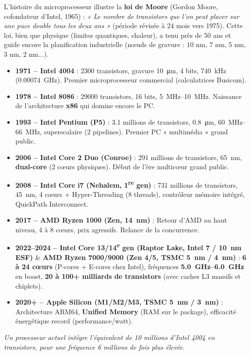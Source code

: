 \documentclass[11pt]{article}
\begin{document}
\noindent
L'histoire du microprocesseur illustre la \textbf{loi de Moore} (Gordon Moore, cofondateur d'Intel, 1965) : \emph{« Le nombre de transistors que l'on peut placer sur une puce double tous les deux ans »} (période révisée à 24 mois vers 1975). Cette loi, bien que physique (limites quantiques, chaleur), a tenu près de 50 ans et guide encore la planification industrielle (nœuds de gravure : 10 nm, 7 nm, 5 nm, 3 nm, 2 nm...).

\begin{savaistu}
\begin{itemize}
    \item \textbf{1971 -- Intel 4004} : \num{2300} transistors, gravure \SI{10}{\micro\meter}, 4 bits, \SI{740}{\kilo\hertz} (\SI{0.00074}{\giga\hertz}). Premier microprocesseur commercial (calculatrices Busicom).
    \item \textbf{1978 -- Intel 8086} : \num{29000} transistors, 16 bits, \SIrange{5}{10}{\mega\hertz}. Naissance de l'architecture \textbf{x86} qui domine encore le PC.
    \item \textbf{1993 -- Intel Pentium (P5)} : \num{3.1} millions de transistors, \SI{0.8}{\micro\meter}, \SIrange{60}{66}{\mega\hertz}, superscalaire (2 pipelines). Premier PC « multimédia » grand public.
    \item \textbf{2006 -- Intel Core 2 Duo (Conroe)} : \num{291} millions de transistors, \SI{65}{\nano\meter}, \textbf{dual-core} (2 cœurs physiques). Début de l'ère multicœur grand public.
    \item \textbf{2008 -- Intel Core i7 (Nehalem, 1\textsuperscript{re} gen)} : \num{731} millions de transistors, \SI{45}{\nano\meter}, 4 cœurs + Hyper-Threading (8 threads), contrôleur mémoire intégré, QuickPath Interconnect.
    \item \textbf{2017 -- AMD Ryzen 1000 (Zen, \SI{14}{\nano\meter})} : Retour d'AMD au haut niveau, 4 à 8 cœurs, prix agressifs. Relance de la concurrence.
    \item \textbf{2022--2024 -- Intel Core 13/14\textsuperscript{e} gen (Raptor Lake, Intel 7 / \SI{10}{\nano\meter} ESF)} \& \textbf{AMD Ryzen 7000/9000 (Zen 4/5, TSMC \SI{5}{\nano\meter} / \SI{4}{\nano\meter})} : \textbf{6 à 24 cœurs} (P-cores + E-cores chez Intel), fréquences \textbf{\SIrange{5.0}{6.0}{\giga\hertz}} en boost, \textbf{20 à 100+ milliards de transistors} (avec caches L3 massifs et chiplets).
    \item \textbf{2020+ -- Apple Silicon (M1/M2/M3, TSMC \SI{5}{\nano\meter} / \SI{3}{\nano\meter})} : Architecture ARM64, \textbf{Unified Memory} (RAM sur le package), efficacité énergétique record (performance/watt).
\end{itemize}
\emph{Un processeur actuel intègre l'équivalent de 10 millions d'Intel 4004 en transistors, pour une fréquence 6 millions de fois plus élevée.}
\end{savaistu}
\end{document}
